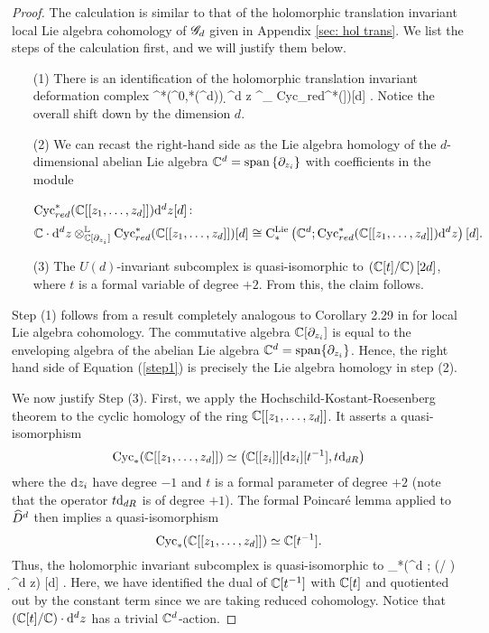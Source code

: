 \begin{proof}
The calculation is similar to that of the holomorphic translation invariant local Lie algebra cohomology of $\mathscr G_d$ given in Appendix \ref{sec: hol trans}. 
We list the steps of the calculation first, and we will justify them below. 
\begin{enumerate}
\item[(1)] There is an identification of the holomorphic translation invariant deformation complex 
\beqn\label{step1}
\Cycloc^*(\Omega^{0,*}(\CC^d)) \simeq \CC \cdot \d^d z \tensor^{}_{\CC[\partial_{z_i}]} {\rm Cyc}_{red}^*(\CC[[z_1,\ldots,z_d]])[d] .
\eeqn
Notice the overall shift down by the dimension $d$. 
\item[(2)] We can recast the right-hand side as the Lie algebra homology of the $d$-dimensional abelian Lie algebra $\mathbb C^d = {\rm span}\left\{\partial_{z_i}\right\}$ with coefficients in the module 

\noindent${\rm Cyc}_{red}^*(\mathbb C[[z_1,\ldots,z_d]]) {\rm d}^d z [d]$:
\[
\mathbb C \cdot {\rm d}^d z \otimes^{\mathbb{L}}_{\mathbb C[\partial_{z_i}]} {\rm Cyc}_{red}^*(\mathbb C[[z_1,\ldots,z_d]])[d] \cong {\rm C}^{\rm Lie}_*\left(\mathbb C^d ; {\rm Cyc}_{red}^*(\mathbb C[[z_1,\ldots,z_d]]) {\rm d}^d z \right)[d] .
\] 
\item[(3)] The $U(d)$-invariant subcomplex is quasi-isomorphic to $\left(\mathbb C[t] / \mathbb C\right) [2d]$, where $t$ is a formal variable of degree $+2$. 
From this, the claim follows. 
\end{enumerate}

Step (1) follows from a result completely analogous to Corollary 2.29 in \cite{BWthesis} for local Lie algebra cohomology. 
The commutative algebra $\mathbb C[\partial_{z_i}]$ is equal to the enveloping algebra of the abelian Lie algebra $\mathbb C^d = {\rm span} \{\partial_{z_i}\}$. 
Hence, the right hand side of Equation (\ref{step1}) is precisely the Lie algebra homology in step (2). 

We now justify Step (3). 
First, we apply the Hochschild-Kostant-Roesenberg theorem to the cyclic homology of the ring $\mathbb C[[z_1,\ldots,z_d]]$.
It asserts a quasi-isomorphism 
\[
{\rm Cyc}_*(\mathbb C[[z_1,\ldots,z_d]]) \simeq \left(\mathbb C[[z_i]][{\rm d} z_i] [t^{-1}], t {\rm d}_{dR}\right)
\]
where the ${\rm d} z_i$ have degree $-1$ and $t$ is a formal parameter of degree $+2$ (note that the operator $t {\rm d}_{dR}$ is of degree $+1$). 
The formal Poincar\'{e} lemma applied to $\widehat{D}^d$ then implies a quasi-isomorphism
\[
{\rm Cyc}_*(\mathbb C[[z_1,\ldots,z_d]]) \simeq \mathbb C [t^{-1}] .
\]
Thus, the holomorphic invariant subcomplex is quasi-isomorphic to
\beqn\label{step3}
\clieu_*(\CC^d ; (\CC [t] / \CC) \cdot \d^d z) [d] .
\eeqn
Here, we have identified the dual of $\mathbb C[t^{-1}]$ with $\mathbb C[t]$ and quotiented out by the constant term since we are taking reduced cohomology. 
Notice that $(\mathbb C [t] / \mathbb C) \cdot {\rm d}^d z$ has a trivial $\mathbb C^d$-action. 


\end{proof}
